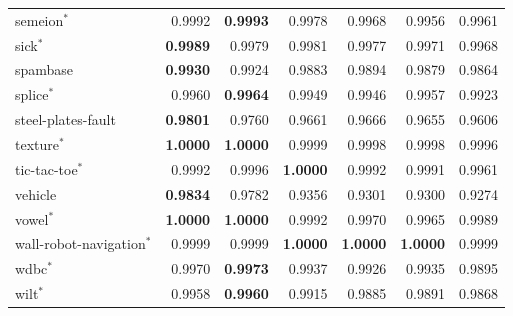 {\begin{longtable}{>{\raggedright\arraybackslash}p{3.3cm}rrrrrr}
semeion$^{*}$ & \num{0.9992} & \textbf{\num{0.9993}} & \num{0.9978} & \num{0.9968} & \num{0.9956} & \num{0.9961} \\
sick$^{*}$ & \textbf{\num{0.9989}} & \num{0.9979} & \num{0.9981} & \num{0.9977} & \num{0.9971} & \num{0.9968} \\
spambase & \textbf{\num{0.9930}} & \num{0.9924} & \num{0.9883} & \num{0.9894} & \num{0.9879} & \num{0.9864} \\
splice$^{*}$ & \num{0.9960} & \textbf{\num{0.9964}} & \num{0.9949} & \num{0.9946} & \num{0.9957} & \num{0.9923} \\
steel-plates-fault & \textbf{\num{0.9801}} & \num{0.9760} & \num{0.9661} & \num{0.9666} & \num{0.9655} & \num{0.9606} \\
texture$^{*}$ & \textbf{\num{1.0000}} & \textbf{\num{1.0000}} & \num{0.9999} & \num{0.9998} & \num{0.9998} & \num{0.9996} \\
tic-tac-toe$^{*}$ & \num{0.9992} & \num{0.9996} & \textbf{\num{1.0000}} & \num{0.9992} & \num{0.9991} & \num{0.9961} \\
vehicle & \textbf{\num{0.9834}} & \num{0.9782} & \num{0.9356} & \num{0.9301} & \num{0.9300} & \num{0.9274} \\
vowel$^{*}$ & \textbf{\num{1.0000}} & \textbf{\num{1.0000}} & \num{0.9992} & \num{0.9970} & \num{0.9965} & \num{0.9989} \\
wall-robot-navigation$^{*}$ & \num{0.9999} & \num{0.9999} & \textbf{\num{1.0000}} & \textbf{\num{1.0000}} & \textbf{\num{1.0000}} & \num{0.9999} \\
wdbc$^{*}$ & \num{0.9970} & \textbf{\num{0.9973}} & \num{0.9937} & \num{0.9926} & \num{0.9935} & \num{0.9895} \\
wilt$^{*}$ & \num{0.9958} & \textbf{\num{0.9960}} & \num{0.9915} & \num{0.9885} & \num{0.9891} & \num{0.9868} \\
\end{longtable}
}
